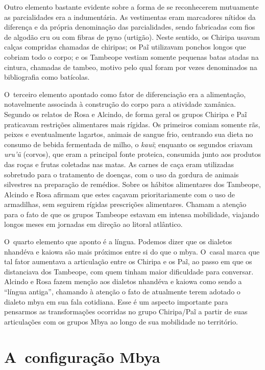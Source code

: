 Outro elemento bastante evidente sobre a forma de se reconhecerem
mutuamente as parcialidades era a indumentária. As vestimentas eram
marcadores nítidos da diferença e da própria denominação das
parcialidades, sendo fabricadas com fios de algodão cru ou com fibras
de pyno (urtigão). Neste sentido, os Chiripa usavam calças compridas
chamadas de chiripas; os Paĩ utilizavam ponchos
longos que cobriam todo o corpo; e os Tambeope vestiam somente pequenas
batas atadas na cintura, chamadas de tambeo, motivo pelo qual foram por
vezes denominados na bibliografia como batícolas.

O~terceiro elemento apontado como fator de diferenciação era a alimentação, notavelmente associada à
construção do corpo para a atividade xamânica. Segundo os relatos de
Rosa e Alcindo, de forma geral os grupos Chiripa e
Paĩ praticavam restrições alimentares mais
rígidas. Os primeiros comiam somente rãs, peixes e eventualmente
lagartos, animais de sangue frio, centrando sua dieta no consumo de
bebida fermentada de milho, o \emph{kauĩ}; enquanto os
segundos criavam \emph{uru’ũ} (corvos), que eram a principal fonte proteica,
consumida junto aos produtos das roças e frutas coletadas nas matas. As
carnes de caça eram utilizadas sobretudo para o tratamento de doenças,
com o uso da gordura de animais silvestres na preparação de remédios.
Sobre os hábitos alimentares dos Tambeope, Alcindo e Rosa afirmam que
estes caçavam prioritariamente com o uso de armadilhas, sem seguirem
rígidas prescrições alimentares. Chamam a atenção para o fato de que os
grupos Tambeope estavam em intensa mobilidade, viajando longos meses em
jornadas em direção ao litoral atlântico. 

O~quarto elemento que aponto é a língua.
Podemos dizer que os dialetos nhandéva e kaiowa são mais próximos entre
si do que o mbya. O~casal marca que
tal fator aumentava a articulação entre os Chiripa e os
Paĩ, ao passo em que os distanciava dos Tambeope,
com quem tinham maior dificuldade para conversar. Alcindo e Rosa fazem
menção aos dialetos nhandéva e kaiowa como sendo a ``língua antiga'',
chamando à atenção o fato de atualmente terem adotado o dialeto mbya em
sua fala cotidiana. Esse é um aspecto importante para pensarmos as
transformações ocorridas no grupo Chiripa/Paĩ a
partir de suas articulações com os grupos Mbya ao longo de sua
mobilidade no território.

\section{A~configuração Mbya}

